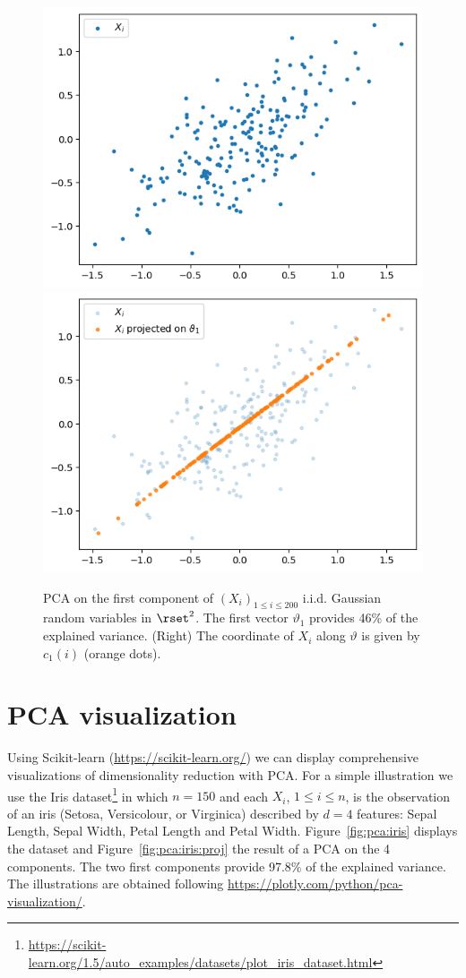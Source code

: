 \begin{figure}
        \centering
            \includegraphics[width=.45\textwidth]{./Illustrations/pca_toy}
\includegraphics[width=.45\textwidth]{./Illustrations/pca_toy_proj}
        \caption{\small PCA on the first component of $(X_i)_{1\leq i \leq 200}$ i.i.d. Gaussian random variables in $\rset^2$. The first vector $\vartheta_1$ provides 46\% of the explained variance. (Right) The coordinate of $X_i$ along $\vartheta$ is given by $c_1(i)$ (orange dots).} 
        \label{fig:pca:toy}
    \end{figure}

\section{PCA visualization}
Using Scikit-learn  (\url{https://scikit-learn.org/}) we can display comprehensive visualizations of dimensionality reduction with PCA. For a simple illustration we use the Iris dataset\footnote{\url{https://scikit-learn.org/1.5/auto_examples/datasets/plot_iris_dataset.html}} in which $n=150$ and each $X_i$, $1\leqslant i \leqslant n$, is the observation of an iris (Setosa, Versicolour, or Virginica) described by $d=4$ features: Sepal Length, Sepal Width, Petal Length and Petal Width. Figure~\ref{fig:pca:iris} displays the dataset and Figure~\ref{fig:pca:iris:proj} the result of a PCA on the 4 components. The two first components provide 97.8\% of the explained variance. The illustrations are obtained following \url{https://plotly.com/python/pca-visualization/}.

